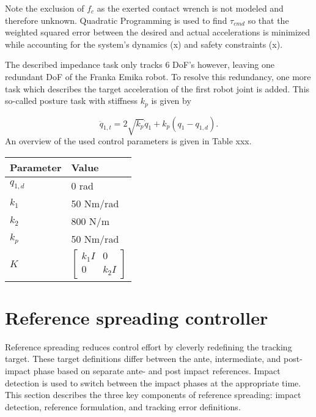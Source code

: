 \documentclass[a4paper, 10pt, conference]{ieeeconf}
\begin{document}
    Note the exclusion of $f_c$ as the exerted contact wrench is not modeled and therefore unknown. Quadratic Programming is used to find $\tau_{cmd}$ so that the weighted squared error between the desired and actual accelerations is minimized while accounting for the system's dynamics (x) and safety constraints (x). 


    The described impedance task only tracks 6 DoF's however, leaving one redundant DoF of the Franka Emika robot. To resolve this redundancy, one more task which describes the target acceleration of the first robot joint is added. This so-called posture task with stiffness $k_p$ is given by
    
    \begin{equation}
    \ddot{q}_{1,t} = 2\sqrt{k_p}\dot{q}_1+k_p(q_1-q_{1,d}).
    \end{equation}
    An overview of the used control parameters is given in Table xxx.
   
    \begin{table}[h]
    \centering
    \begin{tabular}{l|l}
    \hline
    Parameter & Value                                                \\ \hline
    $q_{1,d}$     & 0 rad                                              \\
    $k_1$     & 50 Nm/rad                                            \\
    $k_2$     & 800 N/m                                              \\
    $k_p$     & 50 Nm/rad                                            \\
    $K$       & $\begin{bmatrix} k_1 I &0 \\ 0 & k_2 I\end{bmatrix}$
    \end{tabular}
    \end{table}


    \section{Reference spreading controller}
    Reference spreading reduces control effort by cleverly redefining the tracking target. These target definitions differ between the ante, intermediate, and post-impact phase based on separate ante- and post impact references. Impact detection is used to switch between the impact phases at the appropriate time. This section describes the three key components of reference spreading: impact detection, reference formulation, and tracking error definitions.
\end{document}
